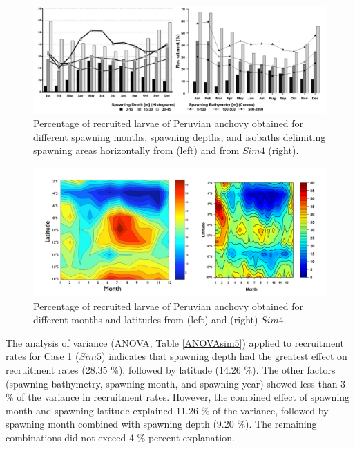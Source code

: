 \begin{figure}[H]
	\includegraphics[width=1.0\textwidth]{figures/Chap3BrocVSFloreBarplots.png}
	\centering
	\caption{Percentage of recruited larvae of Peruvian anchovy obtained for different spawning months, spawning depths, and isobaths delimiting spawning areas horizontally from \cite{BrocLett2008} (left) and from $Sim 4$ (right).}
	\label{Chap3BrocVSFloreBarplots}
\end{figure}

\begin{figure}[H]
	\includegraphics[width=1.0\textwidth]{figures/Chap3BrocVSFloreHovmuller.png}
	\centering
	\caption{Percentage of recruited larvae of Peruvian anchovy obtained for different months and latitudes from (left) \cite{BrocLett2008} and (right) $Sim 4$.}
	\label{Chap3BrocVSFloreHovmuller}
\end{figure}

The analysis of variance (ANOVA, Table \ref{ANOVAsim5}) applied to recruitment rates for Case 1 ($Sim 5$) indicates that spawning depth had the greatest effect on recruitment rates (28.35 \%), followed by latitude (14.26 \%). The other factors (spawning bathymetry, spawning month, and spawning year) showed less than 3 \% of the variance in recruitment rates. However, the combined effect of spawning month and spawning latitude explained 11.26 \% of the variance, followed by spawning month combined with spawning depth (9.20 \%). The remaining combinations did not exceed 4 \% percent explanation.\\

